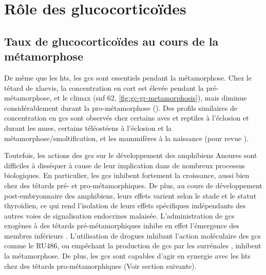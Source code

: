 \documentclass[../main.tex]{subfiles}
\begin{document}


\section{Rôle des glucocorticoïdes}

\subsection{Taux de glucocorticoïdes au cours de la métamorphose}

De même que les \glspl{ht}, les \glspl{gc} sont essentiels pendant la métamorphose.
Chez le têtard de \gls{xlaevis}, la concentration en \gls{cort} est élevée pendant la pré-métamorphose, et le climax (\gls{snf} 62, \autoref{fig:gc-gr-metamorphosis}), mais diminue considérablement durant la pro-métamorphose (\citet{JolivetJaudet1984,Kloas1997}).
Des profils similaires de concentration en \glspl{gc} sont observés chez certains aves et reptiles à l'éclosion et durant les mues, certains téléostéens à l'éclosion et la métamorphose/smoltification, et les mammifères à la naissance (pour revue \citealp{Wada2008}).



Toutefois, les actions des \glspl{gc} sur le développement des amphibiens Anoures sont difficiles à disséquer à cause de leur implication dans de nombreux processus biologiques.
En particulier, les \glspl{gc} inhibent fortement la croissance, aussi bien chez des têtards pré- et pro-métamorphiques.
De plus, au cours de développement post-embryonnaire des amphibiens, leurs effets varient selon le stade et le statut thyroïdien, ce qui rend l'isolation de leurs effets spécifiques indépendants des autres voies de signalisation endocrines malaisée.
L'administration de \glspl{gc} exogènes à des têtards pré-métamorphiques inhibe en effet l'émergence des membres inférieurs \citep{Kobayashi1958}.
L'utilisation de drogues inhibant l'action moléculaire des \glspl{gc} comme le RU486, ou empêchant la production de \glspl{gc} par les surrénales \citep{Kikuyama1982}, inhibent la métamorphose.
De plus, les \glspl{gc} sont capables d'agir en synergie avec les \glspl{ht} chez des têtards pro-métamorphiques \citep{Hayes1993a,Hayes1994,Gray1990} (Voir section suivante).
\end{document}
